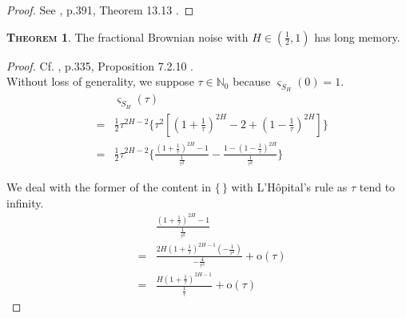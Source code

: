 \documentclass[a4paper, twoside, 11pt]{article}
\theoremstyle{definition}
\newtheorem{theorem}[definition]{\scshape Theorem}
\newcommand{\brkt}[1]{\left({#1} \right)}
\begin{document}
\begin{proof}
  See \cite{michael}, p.391, Theorem 13.13 .
\end{proof}
\begin{theorem}
  The fractional Brownian noise with $H \in (\frac{1}{2}, 1)$ has long memory.
  \label{sec:lmemory}
\end{theorem}
\begin{proof}
  Cf. \cite{nourdin}, p.335, Proposition 7.2.10 .\\
  Without loss of generality, we suppose $\tau \in \mathbb{N}_0$ because $\varsigma_{S_H}(0)=1$. 
  \begin{eqnarray*}
	&&\varsigma_{S_H}(\tau) \\
  &=& \frac{1}{2} \tau^{2H-2}\{ \tau^2[(1+\frac{1}{\tau})^{2H} - 2 + (1-\frac{1}{\tau})^{2H}] \} \\
  &=& \frac{1}{2} \tau^{2H-2}\{ \frac{(1+\frac{1}{\tau})^{2H} - 1 } {\frac{1}{\tau^2}} -  \frac{1 - (1-\frac{1}{\tau})^{2H}} {\frac{1}{\tau^2}} \}
\end{eqnarray*}

We deal with the former of the content in $\{\,\}$ with L'H\^opital's rule as $\tau$ tend to infinity.
\begin{eqnarray*}
  &&\frac{(1+\frac{1}{\tau})^{2H} - 1 } {\frac{1}{\tau^2}} \\
&=& \frac{2H(1+\frac{1}{\tau})^{2H-1}(-\frac{1}{\tau^2})}{-\frac{4}{\tau^3}} + \mathrm{o}(\tau)\\
&=& \frac{H(1+\frac{1}{\tau})^{2H-1}}{\frac{1}{\tau}} + \mathrm{o}(\tau)
\end{eqnarray*}


\end{proof}
\end{document}
